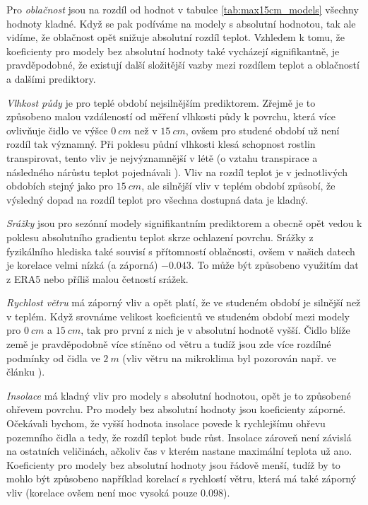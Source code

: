 Pro \textit{oblačnost} jsou na rozdíl od hodnot v tabulce \ref{tab:max15cm_models} všechny hodnoty kladné. Když se pak podíváme na modely s absolutní hodnotou, tak ale vidíme, že oblačnost opět snižuje absolutní rozdíl teplot. Vzhledem k tomu, že koeficienty pro modely bez absolutní hodnoty také vycházejí signifikantně, je pravděpodobné, že existují další složitější vazby mezi rozdílem teplot a oblačností a dalšími prediktory.

\textit{Vlhkost půdy} je pro teplé období nejsilnějším prediktorem. Zřejmě je to způsobeno malou vzdáleností od měření vlhkosti půdy k povrchu, která více ovlivňuje čidlo ve výšce $\SI{0}{cm}$ než v $\SI{15}{cm}$, ovšem pro studené období už není rozdíl tak významný. Při poklesu půdní vlhkosti klesá schopnost rostlin transpirovat, tento vliv je nejvýznamnější v létě (o vztahu transpirace a následného nárůstu teplot pojednávali \cite{snow_deFrenneForestMicroclimates}). Vliv na rozdíl teplot je v jednotlivých obdobích stejný jako pro $\SI{15}{cm}$, ale silnější vliv v teplém období způsobí, že výsledný dopad na rozdíl teplot pro všechna dostupná data je kladný.

\textit{Srážky} jsou pro sezónní modely signifikantním prediktorem a obecně opět vedou k poklesu absolutního gradientu teplot skrze ochlazení povrchu. Srážky z fyzikálního hlediska také souvisí s přítomností oblačnosti, ovšem v našich datech je korelace velmi nízká (a záporná) $-0.043$. To může být způsobeno využitím dat z ERA5 nebo příliš malou četností srážek.

\textit{Rychlost větru} má záporný vliv a opět platí, že ve studeném období je silnější než v teplém. Když srovnáme velikost koeficientů ve studeném období mezi modely pro $\SI{0}{cm}$ a $\SI{15}{cm}$, tak pro první z nich je v absolutní hodnotě vyšší. Čidlo blíže země je pravděpodobně více stíněno od větru a tudíž jsou zde více rozdílné podmínky od čidla ve $\SI{2}{m}$ (vliv větru na mikroklima byl pozorován např. ve článku \cite{wind_contrastingmicroclimates}). 

\textit{Insolace} má kladný vliv pro modely s absolutní hodnotou, opět je to způsobené ohřevem povrchu. Pro modely bez absolutní hodnoty jsou koeficienty záporné. Očekávali bychom, že vyšší hodnota insolace povede k rychlejšímu ohřevu pozemního čidla a tedy, že rozdíl teplot bude růst. Insolace zároveň není závislá na ostatních veličinách, ačkoliv čas v kterém nastane maximální teplota už ano. Koeficienty pro modely bez absolutní hodnoty jsou řádově menší, tudíž by to mohlo být způsobeno například korelací s rychlostí větru, která má také záporný vliv (korelace ovšem není moc vysoká pouze $0.098$).

